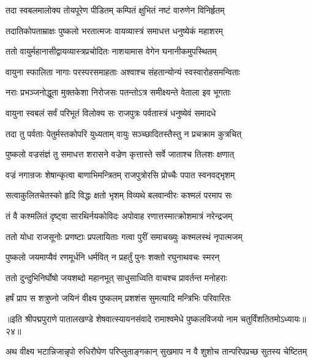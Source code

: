\twolineshloka
{तदा स्वबलमालोक्य तोयपूरेण पीडितम्}
{कम्पितं क्षुभितं नष्टं वारुणेन विनिर्हृतम्}%

\twolineshloka
{तदातिकोपताम्राक्षः पुष्कलो भरतात्मजः}
{वायव्यास्त्रं समाधत्त धनुष्येकं महाशरम्}%

\twolineshloka
{ततो वायुर्महानासीद्वायव्यास्त्रप्रचोदितः}
{नाशयामास वेगेन घनानीकमुपस्थितम्}%

\twolineshloka
{वायुना स्फालिता नागाः परस्परसमाहताः}
{अश्वाश्च संहतान्योन्यं स्वस्वारोहसमन्विताः}%

\twolineshloka
{नराः प्रभञ्जनोद्धूता मुक्तकेशा निरोजसः}
{पतन्तोऽत्र समीक्ष्यन्ते वेताला इव भूगताः}%

\twolineshloka
{वायुना स्वबलं सर्वं परिभूतं विलोक्य सः}
{राजपुत्रः पर्वतास्त्रं धनुष्येवं समादधे}%

\twolineshloka
{तदा तु पर्वताः पेतुर्मस्तकोपरि युध्यताम्}
{वायुः सञ्च्छादितस्तैस्तु न प्रचक्राम कुत्रचित्}%

\twolineshloka
{पुष्कलो वज्रसंज्ञं तु समाधत्त शरासने}
{वज्रेण कृत्तास्ते सर्वे जाताश्च तिलशः क्षणात्}%

\twolineshloka
{वज्रं नगान्रजः शेषान्कृत्वा बाणाभिमन्त्रितम्}
{राजपुत्रोरसि प्रोच्चैः पपात स्वनवद्भृशम्}%

\twolineshloka
{सत्वाकुलितचेतस्को हृदि विद्धः क्षतो भृशम्}
{विव्यथे बलवान्वीरः कश्मलं परमाप सः}%

\twolineshloka
{तं वै कश्मलितं दृष्ट्वा सारथिर्नयकोविदः}
{अपोवाह रणात्तस्मात्क्रोशमात्रं नरेन्द्रजम्}%

\twolineshloka
{ततो योधा राजसूनोः प्रणष्टाः प्रपलायिताः}
{गत्वा पुरीं समाचख्युः कश्मलस्थं नृपात्मजम्}%

\twolineshloka
{पुष्कलो जयमाप्यैवं रणमूर्धनि धर्मवित्}
{न प्रहर्तुं पुनः शक्तो रघुनाथवचः स्मरन्}%

\twolineshloka
{ततो दुन्दुभिनिर्घोषो जयशब्दो महानभूत्}
{साधुसाध्विति वाचश्च प्रावर्तन्त मनोहराः}%

\twolineshloka
{हर्षं प्राप स शत्रुघ्नो जयिनं वीक्ष्य पुष्कलम्}
{प्रशशंस सुमत्यादि मन्त्रिभिः परिवारितः}%

॥इति श्रीपद्मपुराणे पातालखण्डे शेषवात्स्यायनसंवादे रामाश्वमेधे पुष्कलविजयो नाम चतुर्विंशतितमोऽध्यायः॥२४॥



\twolineshloka
{अथ वीक्ष्य भटान्निजान्नृपो रुधिरौघेण परिप्लुताङ्गकान्}
{सुखमाप न वै शुशोच तान्परिपप्रच्छ सुतस्य चेष्टितम्}%

